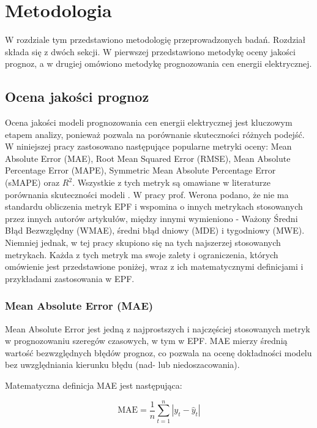 \chapter{Metodologia}
\label{ch:metodologia}

W rozdziale tym przedstawiono metodologię przeprowadzonych badań. Rozdział składa się z dwóch sekcji. W pierwszej przedstawiono metodykę oceny jakości prognoz, a w drugiej omówiono metodykę prognozowania cen energii elektrycznej.

\section{Ocena jakości prognoz}
\label{sec:ocena_jakosci_prognoz}

Ocena jakości modeli prognozowania cen energii elektrycznej jest kluczowym etapem analizy, ponieważ pozwala na porównanie skuteczności różnych podejść. W niniejszej pracy zastosowano następujące popularne metryki oceny: Mean Absolute Error (MAE), Root Mean Squared Error (RMSE), Mean Absolute Percentage Error (MAPE), Symmetric Mean Absolute Percentage Error (sMAPE) oraz \( R^2 \). Wszystkie z tych metryk są omawiane w literaturze porównania skuteczności modeli \cite{en17225797}. W pracy prof. Werona \cite{WERON20141030} podano, że nie ma standardu obliczenia metryk EPF i wspomina o innych metrykach stosowanych przez innych autorów artykułów, między innymi wymieniono - Ważony Średni Błąd Bezwzględny (WMAE), średni błąd dniowy (MDE) i tygodniowy (MWE). Niemniej jednak, w tej pracy skupiono się na tych najszerzej stosowanych metrykach. Każda z tych metryk ma swoje zalety i ograniczenia, których omówienie jest przedstawione poniżej, wraz z ich matematycznymi definicjami i przykładami zastosowania w EPF.

\subsection{Mean Absolute Error (MAE)}
\label{subsec:mae}

Mean Absolute Error jest jedną z najprostszych i najczęściej stosowanych metryk w prognozowaniu szeregów czasowych, w tym w EPF. MAE mierzy średnią wartość bezwzględnych błędów prognoz, co pozwala na ocenę dokładności modelu bez uwzględniania kierunku błędu (nad- lub niedoszacowania).

Matematyczna definicja MAE jest następująca:

\[
\text{MAE} = \frac{1}{n} \sum_{t=1}^{n} \left| y_t - \hat{y}_t \right|
\]


